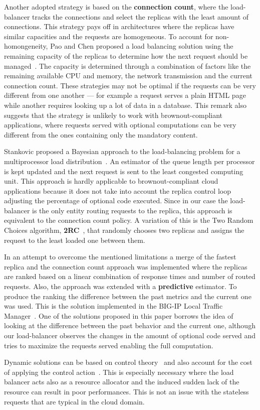Another adopted strategy is based on the \textbf{connection count},
where the load-balancer tracks the connections and select the replicas
with the least amount of connections. This strategy pays off in
architectures where the replicas have similar capacities and the
requests are homogeneous. To account for non-homongeneity, Pao and
Chen proposed a load balancing solution using the remaining capacity
of the replicas to determine how the next request should be
managed~\cite{feedbackintensive}. The capacity is determined through a
combination of factors like the remaining available CPU and memory,
the network transmission and the current connection count.  These
strategies may not be optimal if the requests can be very different
from one another --- for example a request serves a plain HTML page
while another requires looking up a lot of data in a database. This
remark also suggests that the strategy is unlikely to work with
brownout-compliant applications, where requests served with optional
computations can be very different from the ones containing only the
mandatory content.

Stankovic proposed a Bayesian approach to the load-balancing problem
for a multiprocessor load distribution~\cite{Stankovic:TC}. An
estimator of the queue length per processor is kept updated and the
next request is sent to the least congested computing unit. This
approach is hardly applicable to brownout-compliant cloud applications
because it does not take into account the replica control loop
adjusting the percentage of optional code executed. Since in our case
the load-balancer is the only entity routing requests to the replica,
this approach is equivalent to the connection count policy. A
variation of this is the Two Random Choices algorithm,
\textbf{2RC}~\cite{2RC}, that randomly chooses two replicas and
assigns the request to the least loaded one between them.

In an attempt to overcome the mentioned limitations a merge of the
fastest replica and the connection count approach was implemented
where the replicas are ranked based on a linear combination of
response times and number of routed requests. Also, the approach was
extended with a \textbf{predictive} estimator. To produce the ranking
the difference between the past metrics and the current one was
used. This is the solution implemented in the BIG-IP Local Traffic
Manager~\cite{BIGIP}. One of the solutions proposed in this paper
borrows the idea of looking at the difference between the past
behavior and the current one, although our load-balancer observes the
changes in the amount of optional code served and tries to maximize
the requests served enabling the full computation.

Dynamic solutions can be based on control
theory~\cite{multipathctlb,comparisonstaticdynamic} and also account
for the cost of applying the control action~\cite{costofcontrol}. This
is especially necessary where the load balancer acts also as a
resource allocator and the induced sudden lack of the resource can
result in poor performances. This is not an issue with the stateless
requests that are typical in the cloud domain.

